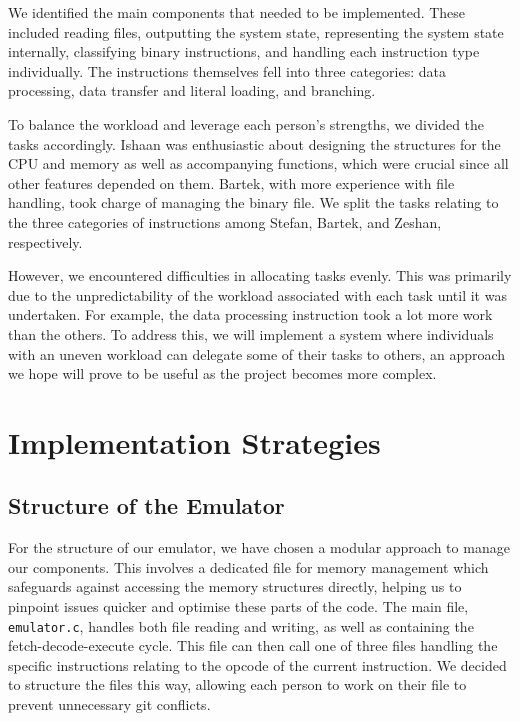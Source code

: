 \documentclass[11pt]{article}
\begin{document}
We identified the main components that needed to be implemented. These included reading files, outputting the system state, representing the system state internally, classifying binary instructions, and handling each instruction type individually. The instructions themselves fell into three categories: data processing, data transfer and literal loading, and branching.

To balance the workload and leverage each person's strengths, we divided the tasks accordingly. Ishaan was enthusiastic about designing the structures for the CPU and memory as well as accompanying functions, which were crucial since all other features depended on them. Bartek, with more experience with file handling, took charge of managing the binary file. We split the tasks relating to the three categories of instructions among Stefan, Bartek, and Zeshan, respectively.

However, we encountered difficulties in allocating tasks evenly. This was primarily due to the unpredictability of the workload associated with each task until it was undertaken. For example, the data processing instruction took a lot more work than the others. To address this, we will implement a system where individuals with an uneven workload can delegate some of their tasks to others, an approach we hope will prove to be useful as the project becomes more complex.


\section{Implementation Strategies}


\subsection{Structure of the Emulator}


For the structure of our emulator, we have chosen a modular approach to manage our components. This involves a dedicated file for memory management which safeguards against accessing the memory structures directly, helping us to pinpoint issues quicker and optimise these parts of the code. The main file, \verb|emulator.c|, handles both file reading and writing, as well as containing the fetch-decode-execute cycle. This file can then call one of three files handling the specific instructions relating to the opcode of the current instruction. We decided to structure the files this way, allowing each person to work on their file to prevent unnecessary git conflicts.
\end{document}
